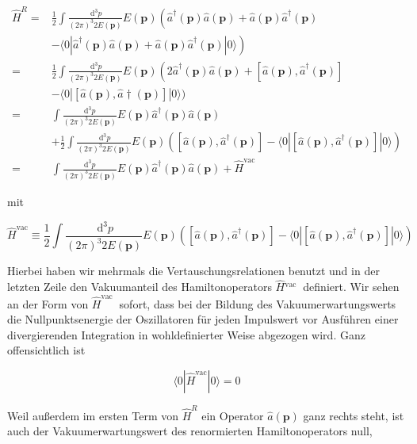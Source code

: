 \documentclass[10pt, letterpaper]{article}
\begin{document}
$$
\begin{aligned}
\hat{H}^{R}= & \frac{1}{2} \int \frac{\mathrm{~d}^{3} p}{(2 \pi)^{3} 2 E(\mathbf{p})} E(\mathbf{p})\left(\hat{a}^{\dagger}(\mathbf{p}) \hat{a}(\mathbf{p})+\hat{a}(\mathbf{p}) \hat{a}^{\dagger}(\mathbf{p})\right. \\
& \left.-\langle 0| \hat{a}^{\dagger}(\mathbf{p}) \hat{a}(\mathbf{p})+\hat{a}(\mathbf{p}) \hat{a}^{\dagger}(\mathbf{p})|0\rangle\right) \\
= & \frac{1}{2} \int \frac{\mathrm{~d}^{3} p}{(2 \pi)^{3} 2 E(\mathbf{p})} E(\mathbf{p})\left(2 \hat{a}^{\dagger}(\mathbf{p}) \hat{a}(\mathbf{p})+\left[\hat{a}(\mathbf{p}), \hat{a}^{\dagger}(\mathbf{p})\right]\right. \\
& -\langle 0|[\hat{a}(\mathbf{p}), \hat{a} \dagger(\mathbf{p})]|0\rangle) \\
= & \int \frac{\mathrm{d}^{3} p}{(2 \pi)^{3} 2 E(\mathbf{p})} E(\mathbf{p}) \hat{a}^{\dagger}(\mathbf{p}) \hat{a}(\mathbf{p}) \\
& +\frac{1}{2} \int \frac{\mathrm{~d}^{3} p}{(2 \pi)^{3} 2 E(\mathbf{p})} E(\mathbf{p})\left(\left[\hat{a}(\mathbf{p}), \hat{a}^{\dagger}(\mathbf{p})\right]-\langle 0|\left[\hat{a}(\mathbf{p}), \hat{a}^{\dagger}(\mathbf{p})\right]|0\rangle\right) \\
= & \int \frac{\mathrm{d}^{3} p}{(2 \pi)^{3} 2 E(\mathbf{p})} E(\mathbf{p}) \hat{a}^{\dagger}(\mathbf{p}) \hat{a}(\mathbf{p})+\hat{H}^{\mathrm{vac}}
\end{aligned}
$$

mit

$$
\hat{H}^{\mathrm{vac}} \equiv \frac{1}{2} \int \frac{\mathrm{~d}^{3} p}{(2 \pi)^{3} 2 E(\mathbf{p})} E(\mathbf{p})\left(\left[\hat{a}(\mathbf{p}), \hat{a}^{\dagger}(\mathbf{p})\right]-\langle 0|\left[\hat{a}(\mathbf{p}), \hat{a}^{\dagger}(\mathbf{p})\right]|0\rangle\right)
$$

Hierbei haben wir mehrmals die Vertauschungsrelationen benutzt und in der letzten Zeile den Vakuumanteil des Hamiltonoperators $\hat{H}{ }^{\text {vac }}$ definiert. Wir sehen an der Form von $\hat{H}^{\text {vac }}$ sofort, dass bei der Bildung des Vakuumerwartungswerts die Nullpunktsenergie der Oszillatoren für jeden Impulswert vor Ausführen einer divergierenden Integration in wohldefinierter Weise abgezogen wird. Ganz offensichtlich ist

$$
\langle 0| \hat{H}^{\mathrm{vac}}|0\rangle=0
$$

Weil außerdem im ersten Term von $\hat{H}^{R}$ ein Operator $\hat{a}(\mathbf{p})$ ganz rechts steht, ist auch der Vakuumerwartungswert des renormierten Hamiltonoperators null,
\end{document}
